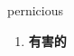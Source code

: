 
\begin{frame}
{\huge pernicious}
\begin{center}
\begin{enumerate}\Large
  \item \textbf{有害的}
\end{enumerate}
\end{center}
\end{frame}
